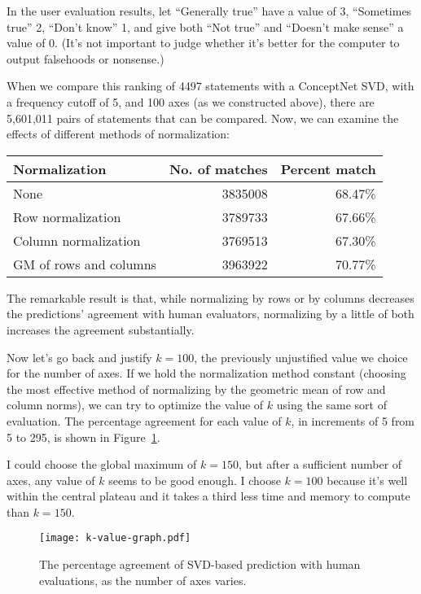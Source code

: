 \documentclass[11pt]{article}
\begin{document}
In the user evaluation results, let ``Generally true'' have a value of 3,
``Sometimes true'' 2, ``Don't know'' 1, and give both ``Not true'' and
``Doesn't make sense'' a value of 0. (It's not important to judge whether it's
better for the computer to output falsehoods or nonsense.)

When we compare this ranking of 4497 statements with a ConceptNet SVD, with a
frequency cutoff of 5, and 100 axes (as we constructed above), there are
5,601,011 pairs of statements that can be compared. Now, we can examine the
effects of different methods of normalization:

\vspace{0.5ex}
\begin{tabular}{lrr}
\hline
{\bf Normalization}         & {\bf No. of matches} & {\bf Percent match}\\
\hline
None                  & 3835008        & 68.47\%\\
Row normalization     & 3789733        & 67.66\%\\
Column normalization  & 3769513        & 67.30\%\\
GM of rows and columns& 3963922        & 70.77\%\\
\hline
\end{tabular}
\vspace{0.5ex}

The remarkable result is that, while normalizing by rows or by columns
decreases the predictions' agreement with human evaluators, normalizing by a
little of both increases the agreement substantially.

Now let's go back and justify $k=100$, the previously unjustified value we
choice for the number of axes. If we hold the normalization method constant (choosing the most effective method of normalizing by the geometric mean of row and column norms), we can try to optimize the value of $k$ using the same sort of evaluation. The percentage agreement for each value of
$k$, in increments of 5 from 5 to 295, is shown in Figure~\ref{k-value-graph}.

I could choose the global maximum of $k=150$, but after a sufficient number of
axes, any value of $k$ seems to be good enough. I choose $k=100$ because it's
well within the central plateau and it takes a third less time and memory to
compute than $k=150$.

\begin{figure}[h]
\begin{center}
\texttt{[image: k-value-graph.pdf]}
\end{center}
\vspace{-2em}
\caption{The percentage agreement of SVD-based prediction with human evaluations, as the number of axes varies.}
\label{k-value-graph}
\end{figure}
\end{document}
